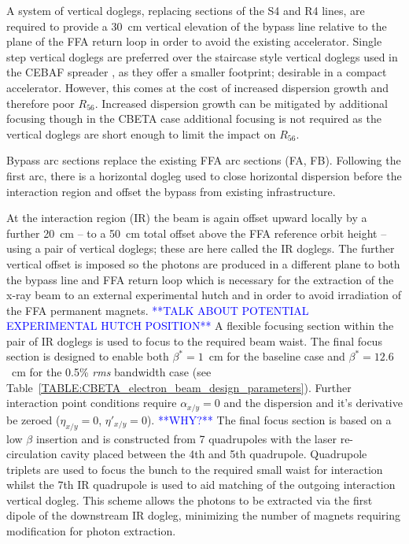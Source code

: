 \documentclass[../main.tex]{subfiles}
\begin{document}
A system of vertical doglegs, replacing sections of the S4 and R4 lines, are required to provide a 30~\si{\centi\meter} vertical elevation of the bypass line relative to the plane of the FFA return loop in order to avoid the existing accelerator. Single step vertical doglegs are preferred over the staircase style vertical doglegs used in the CEBAF spreader \cite{york1987optics}, as they offer a smaller footprint; desirable in a compact accelerator. However, this comes at the cost of increased dispersion growth and therefore poor $R_{56}$. Increased dispersion growth can be mitigated by additional focusing though in the CBETA case additional focusing is not required as the vertical doglegs are short enough to limit the impact on $R_{56}$.   

Bypass arc sections replace the existing FFA arc sections (FA, FB). Following the first arc, there is a horizontal dogleg used to close horizontal dispersion before the interaction region and offset the bypass from existing infrastructure. 

At the interaction region (IR) the beam is again offset upward locally by a further 20~\si{\centi\meter} -- to a 50~\si{\centi\meter} total offset above the FFA reference orbit height -- using a pair of vertical doglegs; these are here called the IR doglegs. The further vertical offset is imposed so the photons are produced in a different plane to both the bypass line and FFA return loop which is necessary for the extraction of the x-ray beam to an external experimental hutch and in order to avoid irradiation of the FFA permanent magnets. \textcolor{blue}{**TALK ABOUT POTENTIAL EXPERIMENTAL HUTCH POSITION**} A flexible focusing section within the pair of IR doglegs is used to focus to the required beam waist. The final focus section is designed to enable both $\beta^{*} = 1$~\si{\centi\meter} for the baseline case and $\beta^{*} = 12.6$~\si{\centi\meter} for the 0.5\% \textit{rms} bandwidth case (see Table~\ref{TABLE:CBETA_electron_beam_design_parameters}). Further interaction point conditions require $\alpha_{x/y} =0$ and the dispersion and it's derivative be zeroed ($\eta_{x/y} = 0$, $\eta'_{x/y} = 0$). \textcolor{blue}{**WHY?**} The final focus section is based on a low $\beta$ insertion \cite{chao2013handbook} and is constructed from 7 quadrupoles with the laser re-circulation cavity placed between the 4th and 5th quadrupole. Quadrupole triplets are used to focus the bunch to the required small waist for interaction whilst the 7th IR quadrupole is used to aid matching of the outgoing interaction vertical dogleg. This scheme allows the photons to be extracted via the first dipole of the downstream IR dogleg, minimizing the number of magnets requiring modification for photon extraction. 
\end{document}
